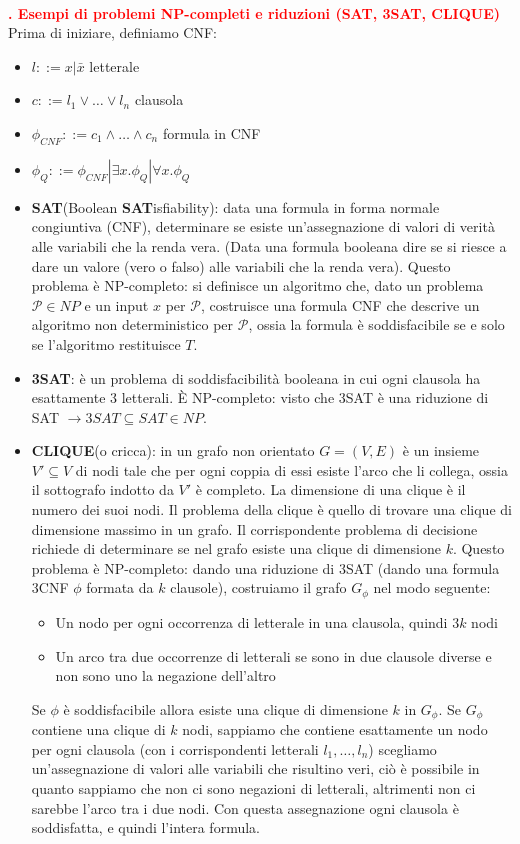 \documentclass[12pt]{article}
\newcounter{questioncounter}
\newcommand{\question}[1]{
    \stepcounter{questioncounter}
    \textbf{\\\textcolor{red}{\arabic{questioncounter}. #1}}\\
}
\begin{document}
\question{Esempi di problemi NP-completi e riduzioni (SAT, 3SAT, CLIQUE)}
Prima di iniziare, definiamo CNF:
\begin{itemize}
    \item $ l ::= x|\bar{x} $ letterale
    \item $ c ::= l_{1}\lor\ldots\lor l_{n} $ clausola
    \item $ \phi_{CNF} ::= c_{1}\land\ldots\land c_{n} $ formula in CNF
    \item $ \phi_{Q} ::= \phi_{CNF}|\exists x.\phi_{Q}|\forall x.\phi_{Q} $
\end{itemize}
\begin{itemize}
    \item \textbf{SAT}(Boolean \textbf{SAT}isfiability): data una formula in forma normale congiuntiva (CNF), determinare se esiste un'assegnazione di valori di verità alle variabili che la renda vera. (Data una formula booleana dire se si riesce a dare un valore (vero o falso) alle variabili che la renda vera). Questo problema è NP-completo: si definisce un algoritmo che, dato un problema $\mathcal{P}\in NP$ e un input $x$ per $\mathcal{P}$, costruisce una formula CNF che descrive un algoritmo non deterministico per $\mathcal{P}$, ossia la formula è soddisfacibile se e solo se l'algoritmo restituisce $T$.
    \item \textbf{3SAT}: è un problema di soddisfacibilità booleana in cui ogni clausola ha esattamente 3 letterali. È NP-completo: visto che 3SAT è una riduzione di SAT $\rightarrow 3SAT\subseteq SAT \in NP$.
    \item \textbf{CLIQUE}(o cricca): in un grafo non orientato $G=(V,E)$ è un insieme $V'\subseteq V$ di nodi tale che per ogni coppia di essi esiste l'arco che li collega, ossia il sottografo indotto da $V'$ è completo. La dimensione di una clique è il numero dei suoi nodi. Il problema della clique è quello di trovare una clique di dimensione massimo in un grafo. Il corrispondente problema di decisione richiede di determinare se nel grafo esiste una clique di dimensione $k$. Questo problema è NP-completo: dando una riduzione di 3SAT (dando una formula 3CNF $\phi$ formata da $k$ clausole), costruiamo il grafo $G_{\phi}$ nel modo seguente: \begin{itemize}
        \item Un nodo per ogni occorrenza di letterale in una clausola, quindi $3k$ nodi
        \item Un arco tra due occorrenze di  letterali se sono in due clausole diverse e non sono uno la negazione dell'altro
    \end{itemize}
    Se $\phi$ è soddisfacibile allora esiste una clique di dimensione $k$ in $G_{\phi}$. Se $G_{\phi}$ contiene una clique di $k$ nodi, sappiamo che contiene esattamente un nodo per ogni clausola (con i corrispondenti letterali $l_{1},\ldots,l_{n}$) scegliamo un'assegnazione di valori alle variabili che risultino veri, ciò è possibile in quanto sappiamo che non ci sono negazioni di letterali, altrimenti non ci sarebbe l'arco tra i due nodi. Con questa assegnazione ogni clausola è soddisfatta, e quindi l'intera formula.
\end{itemize}
\end{document}
